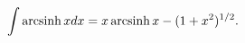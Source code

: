 \[\int\mathop{\mathrm{arcsinh}\/}\nolimits xdx=x\mathop{\mathrm{arcsinh}\/}%
\nolimits x-(1+x^{2})^{1/2}.\]